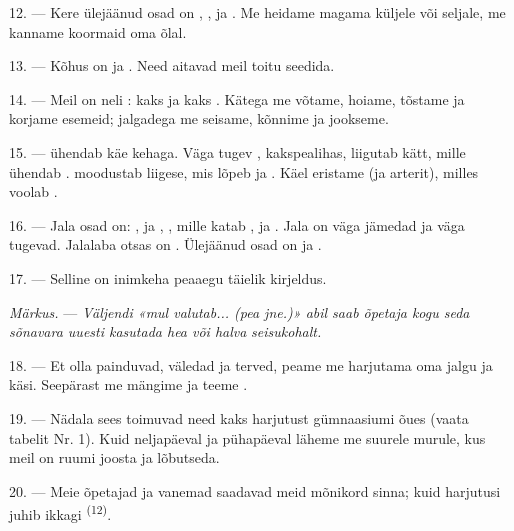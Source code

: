 12. --- Kere ülejäänud osad on , ,  ja
. Me heidame magama küljele või seljale, me kanname koormaid oma õlal.

13. --- Kõhus on  ja . Need aitavad meil toitu seedida.

\VUsaut{4.4mm}
\VUsaut{3.0mm}

14. --- Meil on neli : kaks  ja kaks . Kätega
me võtame, hoiame, tõstame ja korjame esemeid; jalgadega me seisame, kõnnime ja
jookseme.

15. ---  ühendab käe kehaga. Väga tugev , kakspealihas,
liigutab kätt, mille  ühendab . 
moodustab  liigese, mis lõpeb  ja .
Käel eristame  (ja arterit), milles voolab .

16. --- Jala osad on: ,  ja ,
, mille  katab ,  ja
. Jala  on väga jämedad ja väga tugevad. Jalalaba otsas
on . Ülejäänud osad on  ja .

17. --- Selline on inimkeha peaaegu täielik kirjeldus.

\textit{Märkus.} --- \textit{Väljendi «mul valutab... (pea jne.)» abil saab õpetaja
kogu seda sõnavara uuesti kasutada hea või halva} 
\textit{seisukohalt.}

\VUsaut{5.0mm}
\VUsaut{2.4mm}
\VUsaut{3.0mm}

18. --- Et olla painduvad, väledad ja terved, peame me harjutama oma jalgu ja käsi.
Seepärast me mängime ja teeme .

19. --- Nädala sees toimuvad need kaks harjutust gümnaasiumi õues (vaata tabelit
Nr. 1). Kuid neljapäeval ja pühapäeval läheme me suurele murule, kus meil on ruumi
joosta ja lõbutseda.

20. --- Meie õpetajad ja vanemad saadavad meid mõnikord sinna; kuid harjutusi juhib
ikkagi \textsuperscript{(12)}.

